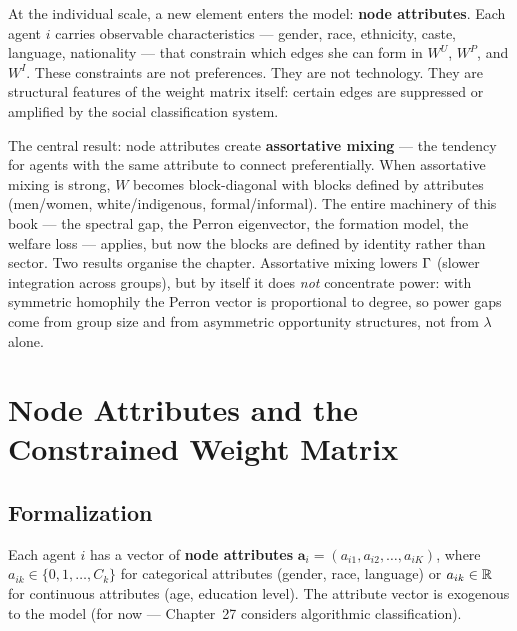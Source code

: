 \documentclass[../structural_economics_book.tex]{subfiles}
\begin{document}
At the individual scale, a new element enters the model: \textbf{node attributes}. Each agent $i$ carries observable characteristics --- gender, race, ethnicity, caste, language, nationality --- that constrain which edges she can form in $W^U$, $W^P$, and $W^I$. These constraints are not preferences. They are not technology. They are structural features of the weight matrix itself: certain edges are suppressed or amplified by the social classification system.

The central result: node attributes create \textbf{assortative mixing} --- the tendency for agents with the same attribute to connect preferentially. When assortative mixing is strong, $W$ becomes block-diagonal with blocks defined by attributes (men/women, white/indigenous, formal/informal). The entire machinery of this book --- the spectral gap, the Perron eigenvector, the formation model, the welfare loss --- applies, but now the blocks are defined by identity rather than sector. Two results organise the chapter. Assortative mixing lowers $\Gamma$ (slower integration across groups), but by itself it does \emph{not} concentrate power: with symmetric homophily the Perron vector is proportional to degree, so power gaps come from group size and from asymmetric opportunity structures, not from $\lambda$ alone.


\section{Node Attributes and the Constrained Weight Matrix}
\label{ch18:sec:attributes}

\subsection{Formalization}

\begin{definition}\label{ch18:def:attributes}
Each agent $i$ has a vector of \textbf{node attributes} $\mathbf{a}_i = (a_{i1}, a_{i2}, \ldots, a_{iK})$, where $a_{ik} \in \{0, 1, \ldots, C_k\}$ for categorical attributes (gender, race, language) or $a_{ik} \in \mathbb{R}$ for continuous attributes (age, education level). The attribute vector is exogenous to the model (for now --- Chapter~27 considers algorithmic classification).
\end{definition}
\end{document}
